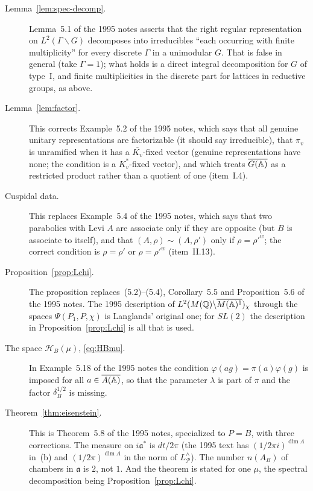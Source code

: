 \begin{description}
\item[Lemma~\ref{lem:spec-decomp}.] Lemma~5.1 of the 1995 notes asserts that the right regular representation
on $L^2(\Gamma\backslash G)$ decomposes into irreducibles ``each occurring
with finite multiplicity'' for every discrete $\Gamma$ in a unimodular
$G$. That is false in general (take $\Gamma=1$); what holds is a direct
integral decomposition for $G$ of type~I, and finite multiplicities in
the discrete part for lattices in reductive groups, as above.

\item[Lemma~\ref{lem:factor}.] This corrects Example~5.2 of the 1995 notes, which says that all genuine
unitary representations are factorizable (it should say irreducible),
that $\pi_v$ is unramified when it has a $\overline{K_v}$-fixed vector
(genuine representations have none; the condition is a $K_v^*$-fixed
vector), and which treats $\overline{G(\mathbb{A})}$ as a restricted product rather than a
quotient of one (item~I.4).

\item[Cuspidal data.] This replaces Example~5.4 of the 1995 notes, which says that two
parabolics with Levi $A$ are associate only if they are opposite (but $B$
is associate to itself), and that $(A,\rho)\sim(A,\rho')$ only if
$\rho=\rho'^w$; the correct condition is $\rho=\rho'$ or $\rho=\rho'^w$
(item~II.13).

\item[Proposition~\ref{prop:Lchi}.] The proposition replaces~(5.2)--(5.4), Corollary~5.5 and Proposition~5.6 of the 1995 notes. The 1995 description of $L^2(M(\mathbb{Q})\backslash\overline{M(\mathbb{A})^1})_\chi$ through the spaces $\Psi(P_1,P,\chi)$ is Langlands' original one; for $SL(2)$ the description in Proposition~\ref{prop:Lchi} is all that is used.

\item[The space $\mathcal H_B(\mu)$, \eqref{eq:HBmu}.] In Example~5.18 of the 1995 notes the condition $\varphi(ag)=\pi(a)\varphi(g)$ is imposed for all $a\in\overline{A(\mathbb{A})}$, so that the parameter $\lambda$ is part of $\pi$ and the factor $\delta_B^{1/2}$ is missing.

\item[Theorem~\ref{thm:eisenstein}.] This is Theorem~5.8 of the 1995 notes, specialized to $P=B$, with three corrections. The measure on $i\mathfrak a^*$ is $dt/2\pi$ (the 1995 text has $(1/2\pi i)^{\dim A}$ in~(b) and $(1/2\pi)^{\dim A}$ in the norm of $L^\wedge_{\mathcal P}$). The number $n(A_B)$ of chambers in $\mathfrak a$ is $2$, not $1$. And the theorem is stated for one $\mu$, the spectral decomposition being Proposition~\ref{prop:Lchi}.


\end{description}
